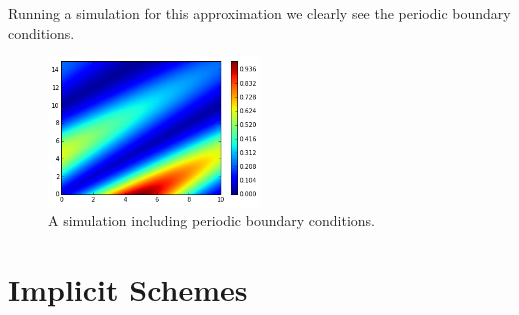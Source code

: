 \documentclass[../main]{subfiles}
\begin{document}
  Running a simulation for this approximation we clearly see the periodic boundary conditions.

  \begin{figure}
    \centering
    \includegraphics[width=0.5\textwidth]{_assets/advection_period.png}
    \caption{\label{diff:fig:advectionPlotPeriod} A simulation including periodic boundary conditions.}
  \end{figure}

  \section{Implicit Schemes}
\end{document}
